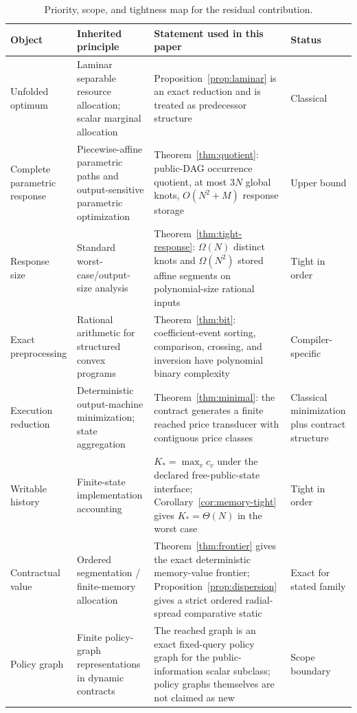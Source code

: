 \begin{table}[p]
\caption{Priority, scope, and tightness map for the residual contribution.}\label{tab:closure-map}
\small\setlength{\tabcolsep}{3pt}
\begin{tabular}{p{}p{}p{}p{}}
\toprule
Object & Inherited principle & Statement used in this paper & Status \\
\midrule
Unfolded optimum & Laminar separable resource allocation; scalar marginal allocation & Proposition~\ref{prop:laminar} is an exact reduction and is treated as predecessor structure & Classical \\
Complete parametric response & Piecewise-affine parametric paths and output-sensitive parametric optimization & Theorem~\ref{thm:quotient}: public-DAG occurrence quotient, at most $3N$ global knots, $O(N^2+M)$ response storage & Upper bound \\
Response size & Standard worst-case/output-size analysis & Theorem~\ref{thm:tight-response}: $\Omega(N)$ distinct knots and $\Omega(N^2)$ stored affine segments on polynomial-size rational inputs & Tight in order \\
Exact preprocessing & Rational arithmetic for structured convex programs & Theorem~\ref{thm:bit}: coefficient-event sorting, comparison, crossing, and inversion have polynomial binary complexity & Compiler-specific \\
Execution reduction & Deterministic output-machine minimization; state aggregation & Theorem~\ref{thm:minimal}: the contract generates a finite reached price transducer with contiguous price classes & Classical minimization plus contract structure \\
Writable history & Finite-state implementation accounting & $K_*=\max_v c_v$ under the declared free-public-state interface; Corollary~\ref{cor:memory-tight} gives $K_*=\Theta(N)$ in the worst case & Tight in order \\
Contractual value & Ordered segmentation / finite-memory allocation & Theorem~\ref{thm:frontier} gives the exact deterministic memory-value frontier; Proposition~\ref{prop:dispersion} gives a strict ordered radial-spread comparative static & Exact for stated family \\
Policy graph & Finite policy-graph representations in dynamic contracts & The reached graph is an exact fixed-query policy graph for the public-information scalar subclass; policy graphs themselves are not claimed as new & Scope boundary \\
\bottomrule
\end{tabular}
\end{table}
